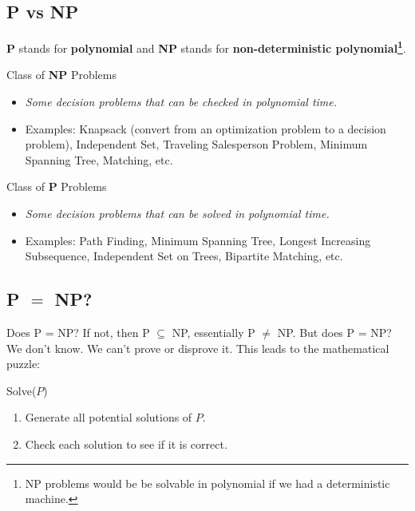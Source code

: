 \documentclass[twoside]{article}
\begin{document}
\subsection{P vs NP}

\textbf{P} stands for \textbf{polynomial} and \textbf{NP} stands for \textbf{non-deterministic 
polynomial\footnote[2]{NP problems would be be solvable in polynomial if we had a deterministic machine.}}.


Class of \textbf{NP} Problems
\begin{itemize}
    \item {\em Some decision problems that can be {\sc checked} in polynomial time.}
    \item Examples: Knapsack (convert from an optimization problem to a decision problem), Independent Set,
    Traveling Salesperson Problem, Minimum Spanning Tree, Matching, etc.
\end{itemize}

Class of \textbf{P} Problems
\begin{itemize}
    \item {\em Some decision problems that can be {\sc solved} in polynomial time.}
    \item Examples: Path Finding, Minimum Spanning Tree, Longest Increasing Subsequence, 
    Independent Set on Trees, Bipartite Matching, etc.
\end{itemize}

\subsection{P $=$ NP?}
Does P = NP? If not, then P $\subseteq$ NP, essentially P $\neq$ NP. But does P = NP? We don't know. 
We can't prove or disprove it. This leads to the mathematical puzzle:

\begin{center}
\end{center}

\begin{algorithm}[H]
\caption*{{\sc Solve($P$)}}
\begin{enumerate}
    \item Generate all potential solutions of $P$.
    \item Check each solution to see if it is correct.
\end{enumerate}
\end{algorithm} 
\end{document}
